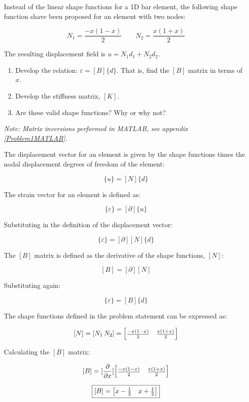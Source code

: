 \documentclass[../main.tex]{subfiles}
\begin{document}

Instead of the linear shape functions for a 1D bar element, the following shape function shave been proposed for an element with two nodes:

\[
    N_1 = \frac{-x(1-x)}{2} \quad \quad N_2 = \frac{x(1+x)}{2}
\]

The resulting displacement field is \(u = N_1d_1 + N_2d_2\).

\begin{enumerate}[label=\alph*)]
    \item Develop the relation: \(\varepsilon = [B]\{{d}\}\). That is, find the \([B]\) matrix in terms of \(x\).
    \item Develop the stiffness matrix, \([K]\).
    \item Are these valid shape functions? Why or why not?
\end{enumerate}


\solution{}
\textit{Note: Matrix inversions performed in MATLAB, see appendix \ref{Problem1MATLAB}.}

The displacement vector for an element is given by the shape functions times the nodal displacement degrees of freedom of the element:

\[
    \{u\} = [N]\{d\}
\]

The strain vector for an element is defined as:

\[
    \{\varepsilon\} = [\partial]\{u\}
\]

Substituting in the definition of the displacement vector:

\[
    \{\varepsilon\} = [\partial][N]\{d\}
\]

The \([B]\) matrix is defined as the derivative of the shape functions, \([N]\):

\[
    [B] = [\partial][N]
\]

Substituting again:

\[
    \{\varepsilon\} = [B]\{d\}
\]

The shape functions defined in the problem statement can be expressed as:

\[
    [N] = [N_1\, N_2] = \mqty[\frac{-x(1-x)}{2} & \frac{x(1+x)}{2}]
\]

Calculating the \([B]\) matrix:

\[
    [B] = [\pdv{x}]\mqty[\frac{-x(1-x)}{2} & \frac{x(1+x)}{2}]
\]

\[
    \boxed{
    [B] = \mqty[x - \frac{1}{2} & x + \frac{1}{2}]
    }
\]
\end{document}
